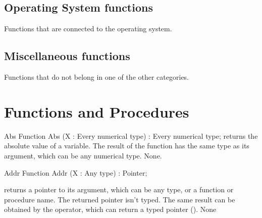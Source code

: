 \subsection{Operating System functions}
Functions that are connected to the operating system.
\begin{funclist}
\end{funclist}

\subsection{Miscellaneous functions}
Functions that do not belong in one of the other categories.
\begin{funclist}
\end{funclist}


\section{Functions and Procedures}

\begin{function}{Abs}
\Declaration
Function Abs (X : Every numerical type) : Every numerical type;
\Description
{} returns the absolute value of a variable. The result of the
function has the same type as its argument, which can be any numerical
type.
\Errors
None.
\SeeAlso
{}
\end{function}


\begin{function}{Addr}
\Declaration
Function Addr (X : Any type) : Pointer;

\Description
{} returns a pointer to its argument, which can be any type, or a
function or procedure name. The returned pointer isn't typed.
The same result can be obtained by the  operator, which can return a
typed pointer (\progref).
\Errors
None
\SeeAlso
{}
\end{function}

